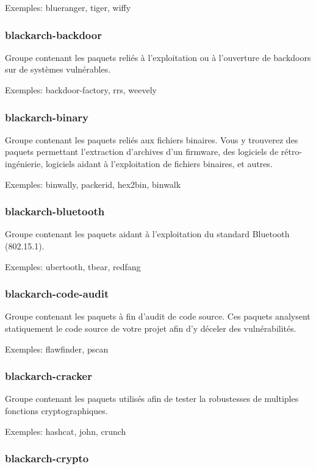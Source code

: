 \documentclass[a4paper, oneside, 11pt]{book}
\begin{document}
Exemples: blueranger, tiger, wiffy

\subsubsection{blackarch-backdoor}


Groupe contenant les paquets reliés à l'exploitation ou à l'ouverture de 
backdoors sur de systèmes vulnérables.

Exemples: backdoor-factory, rrs, weevely

\subsubsection{blackarch-binary}

Groupe contenant les paquets reliés aux fichiers binaires. Vous y trouverez des
paquets permettant l'extraction d'archives d'un firmware, des logiciels de
rétro-ingénierie, logiciels aidant à l'exploitation de fichiers binaires, et
autres.

Exemples: binwally, packerid, hex2bin, binwalk

\subsubsection{blackarch-bluetooth}

Groupe contenant les paquets aidant à l'exploitation du standard Bluetooth
(802.15.1).

Exemples: ubertooth, tbear, redfang

\subsubsection{blackarch-code-audit}

Groupe contenant les paquets à fin d'audit de code source. Ces paquets analysent
statiquement le code source de votre projet afin d'y déceler des vulnérabilités.

Exemples: flawfinder, pscan

\subsubsection{blackarch-cracker}

Groupe contenant les paquets utilisés afin de tester la robustesses de multiples
fonctions cryptographiques.

Exemples: hashcat, john, crunch

\subsubsection{blackarch-crypto}
\end{document}
